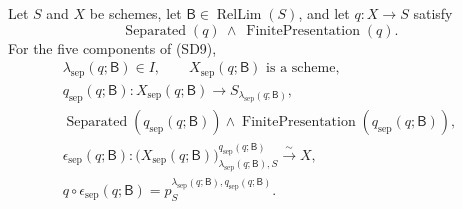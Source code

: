 \begin{lemma}
  \label{lemma:nagata-separated-eventually}

  Let $S$ and $X$ be schemes, let
  \(\mathsf B\in\operatorname{RelLim}(S)\), and let
  \(q\colon X\to S\) satisfy
  \[
    \operatorname{Separated}(q)\ \wedge\
    \operatorname{FinitePresentation}(q).
  \]
  For the five components of (SD9),
  \[
  \begin{gathered}
    \lambda_{\mathrm{sep}}(q;\mathsf B)\in I,\qquad
    X_{\mathrm{sep}}(q;\mathsf B)\text{ is a scheme},\\
    q_{\mathrm{sep}}(q;\mathsf B)\colon
      X_{\mathrm{sep}}(q;\mathsf B)
        \to S_{\lambda_{\mathrm{sep}}(q;\mathsf B)},\\
    \operatorname{Separated}
      (q_{\mathrm{sep}}(q;\mathsf B))
      \wedge
    \operatorname{FinitePresentation}
      (q_{\mathrm{sep}}(q;\mathsf B)),\\
    \epsilon_{\mathrm{sep}}(q;\mathsf B)\colon
      \bigl(X_{\mathrm{sep}}(q;\mathsf B)\bigr)_{
        \lambda_{\mathrm{sep}}(q;\mathsf B),S}^{
          q_{\mathrm{sep}}(q;\mathsf B)}
        \xrightarrow{\sim}X,\\
    q\circ\epsilon_{\mathrm{sep}}(q;\mathsf B)
      =p_S^{
        \lambda_{\mathrm{sep}}(q;\mathsf B),
        q_{\mathrm{sep}}(q;\mathsf B)}.
  \end{gathered}                                                    \tag{SD10}
  \]
\end{lemma}

